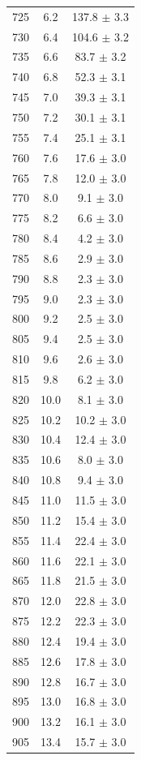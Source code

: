 \documentclass[a4paper,12pt]{article}
\begin{document}
\begin{center}
\begin{longtable}{|c|c|c|}
725 & 6.2 & 137.8 $\pm$  3.3 \\ 
730 & 6.4 & 104.6 $\pm$  3.2 \\ 
735 & 6.6 & 83.7 $\pm$  3.2 \\ 
740 & 6.8 & 52.3 $\pm$  3.1 \\ 
745 & 7.0 & 39.3 $\pm$  3.1 \\ 
750 & 7.2 & 30.1 $\pm$  3.1 \\ 
755 & 7.4 & 25.1 $\pm$  3.1 \\ 
760 & 7.6 & 17.6 $\pm$  3.0 \\ 
765 & 7.8 & 12.0 $\pm$  3.0 \\ 
770 & 8.0 & 9.1 $\pm$  3.0 \\ 
775 & 8.2 & 6.6 $\pm$  3.0 \\ 
780 & 8.4 & 4.2 $\pm$  3.0 \\ 
785 & 8.6 & 2.9 $\pm$  3.0 \\ 
790 & 8.8 & 2.3 $\pm$  3.0 \\ 
795 & 9.0 & 2.3 $\pm$  3.0 \\ 
800 & 9.2 & 2.5 $\pm$  3.0 \\ 
805 & 9.4 & 2.5 $\pm$  3.0 \\ 
810 & 9.6 & 2.6 $\pm$  3.0 \\ 
815 & 9.8 & 6.2 $\pm$  3.0 \\ 
820 & 10.0 & 8.1 $\pm$  3.0 \\ 
825 & 10.2 & 10.2 $\pm$  3.0 \\ 
830 & 10.4 & 12.4 $\pm$  3.0 \\ 
835 & 10.6 & 8.0 $\pm$  3.0 \\ 
840 & 10.8 & 9.4 $\pm$  3.0 \\ 
845 & 11.0 & 11.5 $\pm$  3.0 \\ 
850 & 11.2 & 15.4 $\pm$  3.0 \\ 
855 & 11.4 & 22.4 $\pm$  3.0 \\ 
860 & 11.6 & 22.1 $\pm$  3.0 \\ 
865 & 11.8 & 21.5 $\pm$  3.0 \\ 
870 & 12.0 & 22.8 $\pm$  3.0 \\ 
875 & 12.2 & 22.3 $\pm$  3.0 \\ 
880 & 12.4 & 19.4 $\pm$  3.0 \\ 
885 & 12.6 & 17.8 $\pm$  3.0 \\ 
890 & 12.8 & 16.7 $\pm$  3.0 \\ 
895 & 13.0 & 16.8 $\pm$  3.0 \\ 
900 & 13.2 & 16.1 $\pm$  3.0 \\ 
905 & 13.4 & 15.7 $\pm$  3.0 \\ 

\end{longtable}
\end{center}
\end{document}
